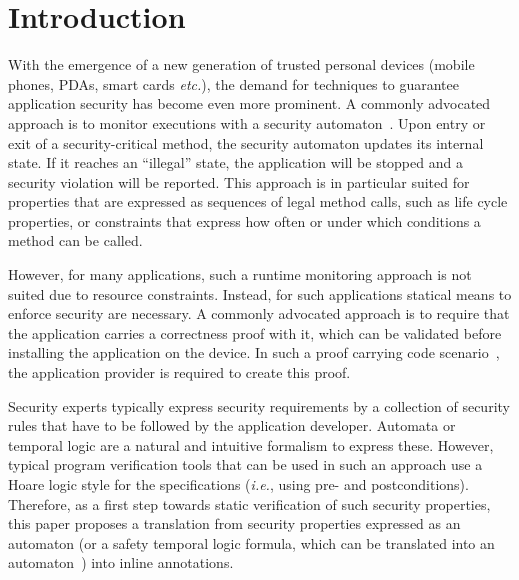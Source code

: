 \section{Introduction}\label{SecIntro}

With the emergence of a new generation of trusted personal devices
(mobile phones, PDAs, smart cards \emph{etc.}), the demand for
techniques to guarantee application security has become even more
prominent. A commonly advocated approach is to monitor
executions with a security automaton~\cite{Schneider99}. Upon entry
or exit of a security-critical method, the security automaton updates
its internal state. If it reaches an ``illegal'' state, the
application will be stopped and a security violation will be
reported. This approach is in particular suited for properties that
are expressed as sequences of legal method calls, such as life cycle
properties, or constraints that express how often or under which
conditions a method can be called.

However, for many applications, such a runtime monitoring approach is
not suited due to resource constraints.
Instead, for such applications
statical means to enforce security are necessary. A commonly advocated
approach is to require that the application carries a correctness
proof with it, which can be validated before installing the application
on the device. In such a proof carrying code scenario~\cite{Necula97},
the application provider is required to create this proof.

Security experts typically express security requirements by a
collection of security rules that have to be followed by the
application developer. Automata or temporal logic are a natural and
intuitive formalism to express these. However, typical program
verification tools that can be used in such an approach use a Hoare
logic style for the specifications (\emph{i.e.}, using pre- and
postconditions). Therefore, as a first step towards static
verification of such security properties, this paper proposes a
translation from security properties expressed as an automaton (or a
safety temporal logic formula, which can be translated into an
automaton~\cite{Wolper01}) into inline annotations.

